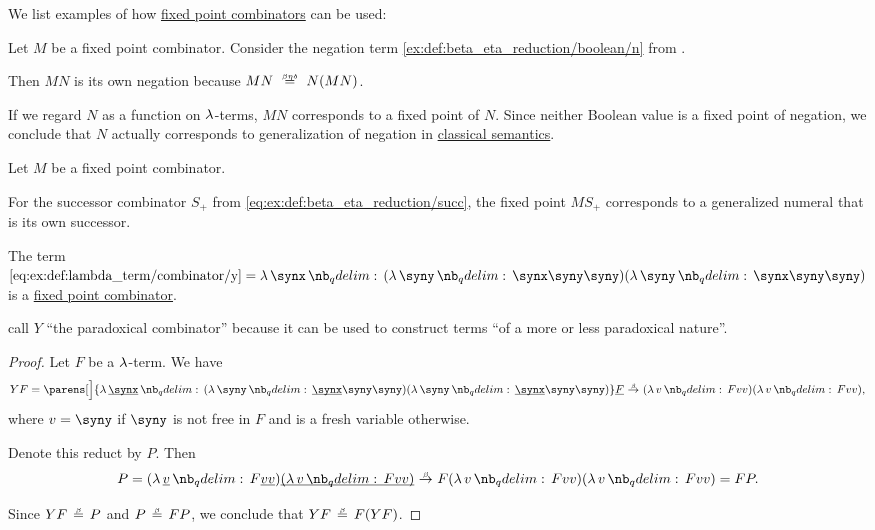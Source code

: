 \begin{example}\label{ex:def:fixed_point_combinator}
  We list examples of how \hyperref[def:fixed_point_combinator]{fixed point combinators} can be used:
  \begin{thmenum}
     Let \( M \) be a fixed point combinator. Consider the negation term \ref{ex:def:beta_eta_reduction/boolean/n} from .

    Then \( MN \) is its own negation because \( MN \equivrel{\beta\eta\delta} N(MN) \).

    If we regard \( N \) as a function on \( \mathrm{\lambda} \)-terms, \( MN \) corresponds to a fixed point of \( N \). Since neither Boolean value is a fixed point of negation, we conclude that \( N \) actually corresponds to generalization of negation in \hyperref[def:propositional_semantics/classical]{classical semantics}.

     Let \( M \) be a fixed point combinator.

    For the successor combinator \( S_+ \) from \eqref{eq:ex:def:beta_eta_reduction/succ}, the fixed point \( MS_+ \) corresponds to a generalized numeral that is its own successor.
  \end{thmenum}
\end{example}

\begin{proposition}\label{thm:y_is_a_fixed_point_combinator}
  The term \( \ref{eq:ex:def:lambda_term/combinator/y} = \qabs \synx (\qabs \syny \synx \syny \syny) (\qabs \syny \synx \syny \syny) \) is a \hyperref[def:fixed_point_combinator]{fixed point combinator}.
\end{proposition}
\begin{comments}
  \item {} call \( Y \) \enquote{the paradoxical combinator} because it can be used to construct terms \enquote{of a more or less paradoxical nature}.
\end{comments}
\begin{proof}
  Let \( F \) be a \( \mathrm{\lambda} \)-term. We have
  \begin{equation*}
    YF
    =
    \parens[\Big]{ \qabs {\hi{\synx}} (\qabs \syny \hi{\synx} \syny \syny) (\qabs \syny \hi{\synx} \syny \syny) } \hi{F}
    \bred
    (\qabs v F v v) (\qabs v F v v),
  \end{equation*}
  where \( v = \syny \) if \( \syny \) is not free in \( F \) and is a fresh variable otherwise.

  Denote this reduct by \( P \). Then
  \begin{equation*}
    P =
    (\qabs {\hi{v}} F \hi{v} \hi{v}) \hi{(\qabs v F v v)}
    \bred
    F (\qabs v F v v) (\qabs v F v v)
    =
    FP.
  \end{equation*}

  Since \( YF \equivrel\beta P \) and \( P \equivrel\beta FP \), we conclude that \( YF \equivrel\beta F(YF) \).
\end{proof}


